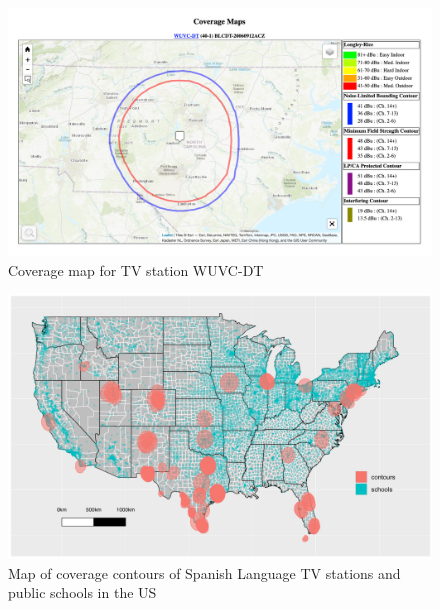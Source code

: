 \documentclass[11pt]{article}
\begin{document}
\begin{figure}[!hbtp]
\centering
\caption{Coverage map for TV station WUVC-DT}\label{f:contour_example}
\includegraphics[width=14.4cm]{../../analysis/Output/img/ContourExample.png}
\end{figure} 

\begin{figure}[!hbtp]
\centering
\caption{Map of coverage contours of Spanish Language TV stations and public schools in the US}\label{f:contours_schools}
\includegraphics[width=14.4cm]{../../analysis/Output/img/Schools_pretty2.pdf}
\end{figure} 
\end{document}
